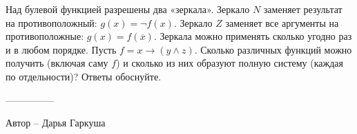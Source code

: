 \question
Над булевой функцией разрешены два «зеркала». Зеркало $N$ заменяет результат на противоположный: $g(x)=\neg f(x)$. Зеркало $Z$ заменяет все аргументы на противоположные: $g(x)=f(\overline{x})$. Зеркала можно применять сколько угодно раз и в любом порядке. Пусть $f=x\to(y\wedge z)$. Сколько различных функций можно получить (включая саму $f$) и сколько из них образуют полную систему (каждая по отдельности)? Ответы обоснуйте.

---------------

Автор -- Дарья Гаркуша